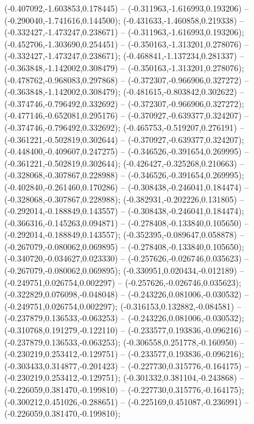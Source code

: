 (-0.407092,-1.603853,0.178445) -- (-0.311963,-1.616993,0.193206) -- (-0.290040,-1.741616,0.144500);
 (-0.431633,-1.460858,0.219338) -- (-0.332427,-1.473247,0.238671) -- (-0.311963,-1.616993,0.193206);
 (-0.452706,-1.303690,0.254451) -- (-0.350163,-1.313201,0.278076) -- (-0.332427,-1.473247,0.238671);
 (-0.468841,-1.137234,0.281337) -- (-0.363848,-1.142002,0.308479) -- (-0.350163,-1.313201,0.278076);
 (-0.478762,-0.968083,0.297868) -- (-0.372307,-0.966906,0.327272) -- (-0.363848,-1.142002,0.308479);
 (-0.481615,-0.803842,0.302622) -- (-0.374746,-0.796492,0.332692) -- (-0.372307,-0.966906,0.327272);
 (-0.477146,-0.652081,0.295176) -- (-0.370927,-0.639377,0.324207) -- (-0.374746,-0.796492,0.332692);
 (-0.465753,-0.519207,0.276191) -- (-0.361221,-0.502819,0.302644) -- (-0.370927,-0.639377,0.324207);
 (-0.448400,-0.409607,0.247275) -- (-0.346526,-0.391654,0.269995) -- (-0.361221,-0.502819,0.302644);
 (-0.426427,-0.325268,0.210663) -- (-0.328068,-0.307867,0.228988) -- (-0.346526,-0.391654,0.269995);
 (-0.402840,-0.261460,0.170286) -- (-0.308438,-0.246041,0.184474) -- (-0.328068,-0.307867,0.228988);
 (-0.382931,-0.202226,0.131805) -- (-0.292014,-0.188849,0.143557) -- (-0.308438,-0.246041,0.184474);
 (-0.366316,-0.145263,0.094871) -- (-0.278408,-0.133840,0.105650) -- (-0.292014,-0.188849,0.143557);
 (-0.352395,-0.089647,0.058878) -- (-0.267079,-0.080062,0.069895) -- (-0.278408,-0.133840,0.105650);
 (-0.340720,-0.034627,0.023330) -- (-0.257626,-0.026746,0.035623) -- (-0.267079,-0.080062,0.069895);
 (-0.330951,0.020434,-0.012189) -- (-0.249751,0.026754,0.002297) -- (-0.257626,-0.026746,0.035623);
 (-0.322829,0.076098,-0.048048) -- (-0.243226,0.081006,-0.030532) -- (-0.249751,0.026754,0.002297);
 (-0.316153,0.132882,-0.084581) -- (-0.237879,0.136533,-0.063253) -- (-0.243226,0.081006,-0.030532);
 (-0.310768,0.191279,-0.122110) -- (-0.233577,0.193836,-0.096216) -- (-0.237879,0.136533,-0.063253);
 (-0.306558,0.251778,-0.160950) -- (-0.230219,0.253412,-0.129751) -- (-0.233577,0.193836,-0.096216);
 (-0.303433,0.314877,-0.201423) -- (-0.227730,0.315776,-0.164175) -- (-0.230219,0.253412,-0.129751);
 (-0.301332,0.381104,-0.243868) -- (-0.226059,0.381470,-0.199810) -- (-0.227730,0.315776,-0.164175);
 (-0.300212,0.451026,-0.288651) -- (-0.225169,0.451087,-0.236991) -- (-0.226059,0.381470,-0.199810);
